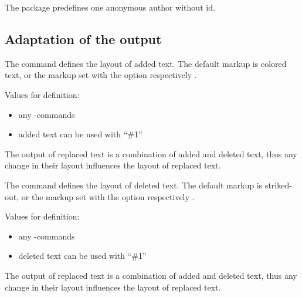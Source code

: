 The package predefines one anonymous author without id.



\subsection{Adaptation of the output}
\label{sec:ui:customizingoutput}

\localtableofcontents



The command  defines the layout of added text.
The default markup is colored text, or the markup set with the option  respectively .

Values for definition:

\begin{itemize}
	\item any -commands
	\item added text can be used with ``\#1''
\end{itemize}

The output of replaced text is a combination of added and deleted text, thus any change in their layout influences the layout of replaced text.





The command  defines the layout of deleted text.
The default markup is striked-out, or the markup set with the option  respectively .

Values for definition:

\begin{itemize}
	\item any -commands
	\item deleted text can be used with ``\#1''
\end{itemize}

The output of replaced text is a combination of added and deleted text, thus any change in their layout influences the layout of replaced text.



